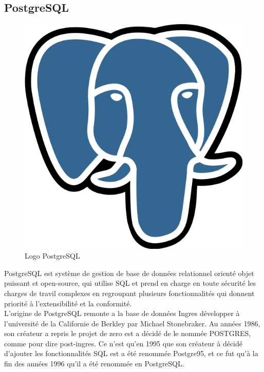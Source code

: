     \subsection{PostgreSQL}
    \begin{figure}[H]
        \centering
        \includegraphics[scale=0.2]{ACR/postgresql.png}
        \caption{Logo PostgreSQL}
    \end{figure}
    
    PostgreSQL\cite{postgres} est système de gestion de base de données relationnel orienté objet puissant et open-source, qui utilise \acs{SQL} et prend en charge en toute sécurité les charges de travil complexes en regroupant plusieurs fonctionnalités qui donnent priorité à l'extensibilité et la conformité.\\

    L'origine de PostgreSQL remonte a la base de données Ingres développer à l'université de la Californie de Berkley par Michael Stonebraker. Au années 1986, son créateur a repris le projet de zero est a décidé de le nommée POSTGRES, comme pour dire post-ingres. Ce n'est qu'en 1995 que son créateur à décidé d'ajouter les fonctionnalités \acs{SQL} est a été renommée Postgre95, et ce fut qu'à la fin des années 1996 qu'il a été renommée en PostgreSQL.\\
    
